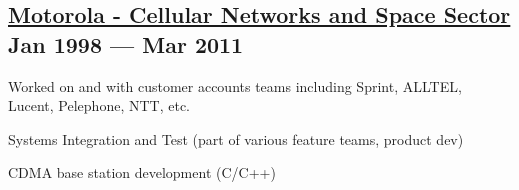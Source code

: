 \vspace*{5pt}
\subsection{{\href{https://www.motorolasolutions.com/en_us.html}{Motorola - Cellular Networks and Space Sector} \hfill Jan 1998 --- Mar 2011}}
\vspace*{5pt}
{\footnotesize
}
\begin{zitemize}
	\item Worked on and with customer accounts teams including Sprint, ALLTEL, Lucent, Pelephone, NTT, etc.
	\item Systems Integration and Test (part of various feature teams, product dev)
	\item CDMA base station development (C/C++) 
\end{zitemize}